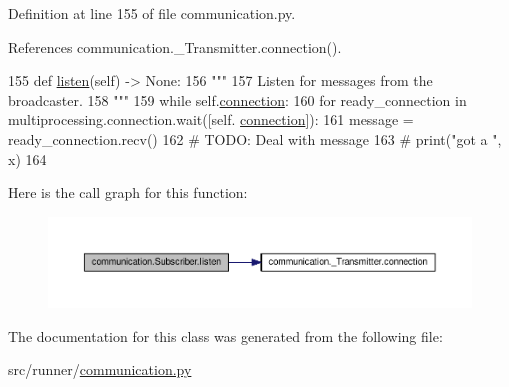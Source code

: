 Definition at line 155 of file communication.\+py.



References communication.\+\_\+\+Transmitter.\+connection().


\begin{DoxyCode}
155     \textcolor{keyword}{def }\hyperlink{classcommunication_1_1Subscriber_a9c46d95ba346a8d95da29088fc130f93}{listen}(self) -> None:
156         \textcolor{stringliteral}{"""}
157 \textcolor{stringliteral}{        Listen for messages from the broadcaster.}
158 \textcolor{stringliteral}{        """}
159         \textcolor{keywordflow}{while} self.\hyperlink{classcommunication_1_1__Transmitter_af3f5e819de9b1235db609470d6341d28}{connection}:
160             \textcolor{keywordflow}{for} ready\_connection \textcolor{keywordflow}{in} multiprocessing.connection.wait([self.
      \hyperlink{classcommunication_1_1__Transmitter_af3f5e819de9b1235db609470d6341d28}{connection}]):
161                 message = ready\_connection.recv()
162                 \textcolor{comment}{# TODO: Deal with message}
163                 \textcolor{comment}{# print("got a ", x)}
164 
\end{DoxyCode}


Here is the call graph for this function\+:\nopagebreak
\begin{figure}[H]
\begin{center}
\leavevmode
\includegraphics[width=350pt]{classcommunication_1_1Subscriber_a9c46d95ba346a8d95da29088fc130f93_cgraph}
\end{center}
\end{figure}




The documentation for this class was generated from the following file\+:\begin{DoxyCompactItemize}
\item 
src/runner/\hyperlink{communication_8py}{communication.\+py}\end{DoxyCompactItemize}

